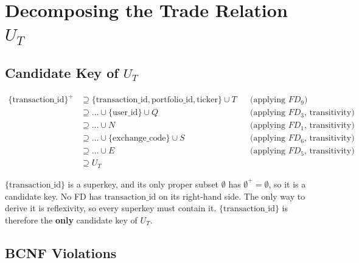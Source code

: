 \documentclass{article}
\newcommand{\at}[1]{\text{#1}}
\newcommand{\cl}[1]{\{#1\}^+}
\begin{document}
\section{Decomposing the Trade Relation $U_T$}

\subsection*{Candidate Key of $U_T$}

\begin{align*}
  \cl{\at{transaction\_id}}
    &\supseteq \{\at{transaction\_id}, \at{portfolio\_id}, \at{ticker}\} \cup T && \text{(applying } FD_9\text{)} \\
    &\supseteq \ldots \cup \{\at{user\_id}\} \cup Q && \text{(applying } FD_3\text{, transitivity)} \\
    &\supseteq \ldots \cup N && \text{(applying } FD_1\text{, transitivity)} \\
    &\supseteq \ldots \cup \{\at{exchange\_code}\} \cup S && \text{(applying } FD_6\text{, transitivity)} \\
    &\supseteq \ldots \cup E && \text{(applying } FD_5\text{, transitivity)} \\
    &\supseteq U_T
\end{align*}

$\{\at{transaction\_id}\}$ is a superkey, and its only proper subset $\emptyset$ has $\emptyset^+ = \emptyset$, so it is a candidate key. No FD has $\at{transaction\_id}$ on its right-hand side. The only way to derive it is reflexivity, so every superkey must contain it. $\{\at{transaction\_id}\}$ is therefore the \textbf{only} candidate key of $U_T$.

\subsection*{BCNF Violations}
\end{document}
